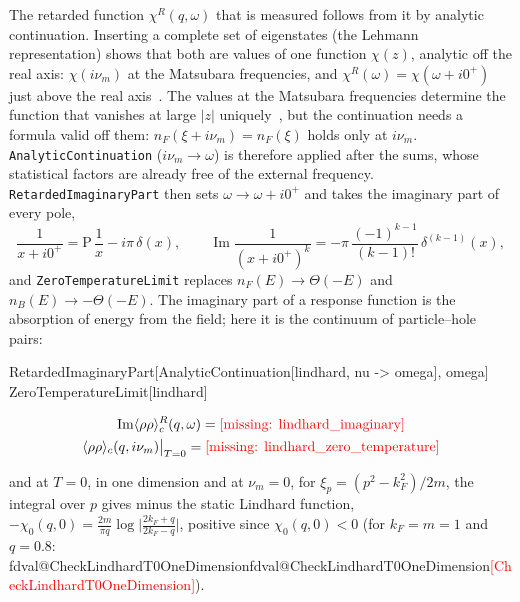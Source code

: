 \documentclass[11pt,a4paper]{article}
\makeatletter
\newcommand{\formula}[1]{\IfFileExists{figures/formula_#1.tex}{}{\text{\textcolor{red}{[missing: \detokenize{#1}]}}}}
\newcommand{\pkg}[1]{\texttt{#1}}
\newcommand{\val}[1]{\ifcsname fdval@#1\endcsname\csname fdval@#1\endcsname\else\textcolor{red}{[#1]}\fi}
\makeatother
\begin{document}
The retarded function $\chi^R(q,\omega)$ that is measured follows from it by analytic continuation. Inserting a complete
set of eigenstates (the Lehmann representation) shows that both are values of one function $\chi(z)$, analytic off the
real axis: $\chi(i\nu_m)$ at the Matsubara frequencies, and $\chi^R(\omega)=\chi(\omega+i0^+)$ just above the real
axis~\cite{FetterWalecka,Mahan,BruusFlensberg}. The values at the Matsubara frequencies determine the function that
vanishes at large $|z|$ uniquely~\cite{BaymMermin1961}, but the continuation needs a formula valid off them:
$n_F(\xi+i\nu_m)=n_F(\xi)$ holds only at $i\nu_m$. \pkg{AnalyticContinuation} ($i\nu_m\to\omega$) is therefore applied
after the sums, whose statistical factors are already free of the external frequency. \pkg{RetardedImaginaryPart} then
sets $\omega\to\omega+i0^+$ and takes the imaginary part of every pole,
\[
\frac1{x+i0^+}=\mathrm P\,\frac1x-i\pi\,\delta(x),\qquad
\operatorname{Im}\frac1{(x+i0^+)^k}=-\pi\,\frac{(-1)^{k-1}}{(k-1)!}\,\delta^{(k-1)}(x),
\]
and \pkg{ZeroTemperatureLimit} replaces $n_F(E)\to\Theta(-E)$ and $n_B(E)\to-\Theta(-E)$. The imaginary part of a response
function is the absorption of energy from the field; here it is the continuum of particle--hole pairs:
\begin{code}
RetardedImaginaryPart[AnalyticContinuation[lindhard, nu -> omega], omega]
ZeroTemperatureLimit[lindhard]
\end{code}
\begin{outputbox}
\vspace{-6pt}
\begin{gather*}
\operatorname{Im}\langle\rho\rho\rangle^R_c(q,\omega)=\formula{lindhard_imaginary}\\
\langle\rho\rho\rangle_c(q,i\nu_m)\big|_{T=0}=\formula{lindhard_zero_temperature}
\end{gather*}
\end{outputbox}
and at $T=0$, in one dimension and at $\nu_m=0$, for $\xi_p=(p^2-k_F^2)/2m$, the integral over $p$ gives minus the static
Lindhard function, $-\chi_0(q,0)=\frac{2m}{\pi q}\log\bigl|\frac{2k_F+q}{2k_F-q}\bigr|$, positive since $\chi_0(q,0)<0$
(for $k_F=m=1$ and $q=0.8$: \val{CheckLindhardT0OneDimension}).
\end{document}
